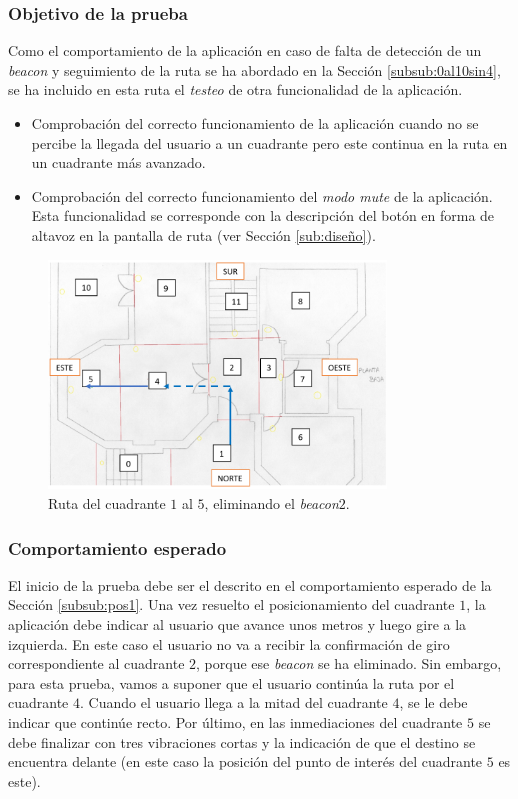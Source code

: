 \subsubsection*{Objetivo de la prueba}

Como el comportamiento de la aplicación en caso de falta de detección de un \textit{beacon} y seguimiento de la ruta se ha abordado en la Sección \ref{subsub:0al10sin4}, se ha incluido en esta ruta el \textit{testeo} de otra funcionalidad de la aplicación. 

\begin{itemize}
	\item Comprobación del correcto funcionamiento de la aplicación cuando no se percibe la llegada del usuario a un cuadrante pero este continua en la ruta en un cuadrante más avanzado.
	
	\item Comprobación del correcto funcionamiento del \textit{modo mute} de la aplicación. Esta funcionalidad se corresponde con la descripción del botón en forma de altavoz en la pantalla de ruta (ver Sección \ref{sub:diseño}). 
\end{itemize}

\begin{figure}[t]
	\centering
	\includegraphics[width=0.8\textwidth]{Imagenes/Evaluacion/del1al5sin2}
	\caption{Ruta del cuadrante $1$ al $5$, eliminando el \textit{beacon$2$}.}
	\label{fig:del1al5sin2}
\end{figure}

\subsubsection*{Comportamiento esperado}

El inicio de la prueba debe ser el descrito en el comportamiento esperado de la Sección \ref{subsub:pos1}. Una vez resuelto el posicionamiento del cuadrante $1$, la aplicación debe indicar al usuario que avance unos metros y luego gire a la izquierda. En este caso el usuario no va a recibir la confirmación de giro correspondiente al cuadrante $2$, porque ese \textit{beacon} se ha eliminado. Sin embargo, para esta prueba, vamos a suponer que el usuario continúa la ruta por el cuadrante $4$. Cuando el usuario llega a la mitad del cuadrante $4$, se le debe indicar que continúe recto. Por último, en las inmediaciones del cuadrante $5$ se debe finalizar con tres vibraciones cortas y la indicación de que el destino se encuentra delante (en este caso la posición del punto de interés del cuadrante $5$ es este).

